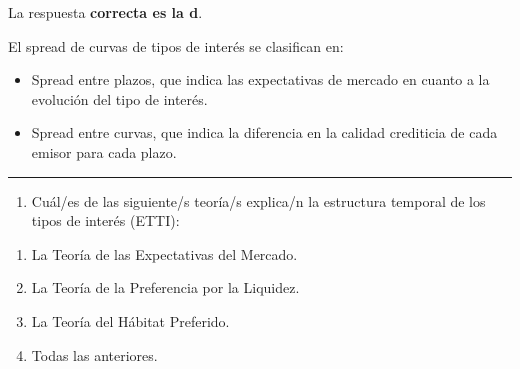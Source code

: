 \documentclass[
  letterpaper,
  DIV=11,
  numbers=noendperiod]{scrreprt}
\providecommand{\tightlist}{%
  \setlength{\itemsep}{0pt}\setlength{\parskip}{0pt}}\usepackage{longtable,booktabs,array}
\begin{document}
\begin{tcolorbox}
\begin{tcolorbox}[enhanced jigsaw, toprule=.15mm, left=2mm, arc=.35mm, breakable, bottomrule=.15mm, opacityback=0, rightrule=.15mm, leftrule=.75mm, colframe=quarto-callout-note-color-frame, colback=white]
\begin{minipage}[t]{5.5mm}
\textcolor{quarto-callout-note-color}{\faInfo}
\end{minipage}%
\begin{minipage}[t]{\textwidth - 5.5mm}

La respuesta \textbf{correcta es la d}.

El spread de curvas de tipos de interés se clasifican en:

\begin{itemize}
\item
  Spread entre plazos, que indica las expectativas de mercado en cuanto
  a la evolución del tipo de interés.
\item
  Spread entre curvas, que indica la diferencia en la calidad crediticia
  de cada emisor para cada plazo.
\end{itemize}

\end{minipage}%
\end{tcolorbox}

\begin{center}\rule{0.5\linewidth}{0.5pt}\end{center}

\begin{enumerate}
\def\labelenumi{\arabic{enumi}.}
\setcounter{enumi}{15}
\tightlist
\item
  Cuál/es de las siguiente/s teoría/s explica/n la estructura temporal
  de los tipos de interés (ETTI):
\end{enumerate}

\begin{enumerate}
\def\labelenumi{\alph{enumi}.}
\item
  La Teoría de las Expectativas del Mercado.
\item
  La Teoría de la Preferencia por la Liquidez.
\item
  La Teoría del Hábitat Preferido.
\item
  Todas las anteriores.
\end{enumerate}

\begin{tcolorbox}[enhanced jigsaw, toprule=.15mm, left=2mm, arc=.35mm, breakable, bottomrule=.15mm, opacityback=0, rightrule=.15mm, leftrule=.75mm, colframe=quarto-callout-note-color-frame, colback=white]
\begin{minipage}[t]{5.5mm}
\textcolor{quarto-callout-note-color}{\faInfo}
\end{minipage}%
\begin{minipage}[t]{\textwidth - 5.5mm}


\end{minipage}
\end{tcolorbox}
\end{tcolorbox}
\end{document}
